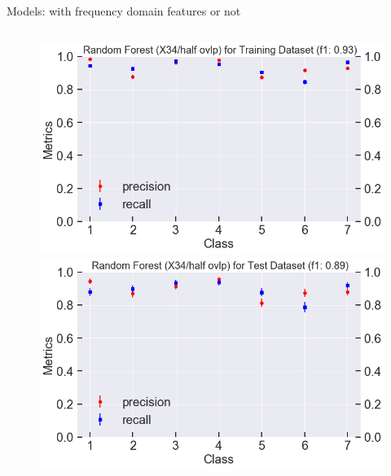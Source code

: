 \documentclass{if-beamer}
\begin{document}
\begin{frame}{Models: with frequency domain features or not}
\begin{columns}
\begin{column}{0.5\textwidth}
             \begin{figure}
            \includegraphics[scale=0.2]{./figs/rf_X34_half_train_score.png}
            \includegraphics[scale=0.2]{./figs/rf_X34_half_test_score.png}
            \end{figure}
            
 \end{column}

 \end{columns}
 
\end{frame}
 
\end{document}
